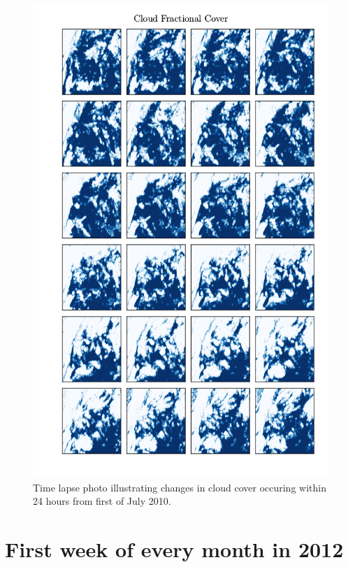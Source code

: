 \begin{figure}[ht]
    \centering
    \includegraphics[scale=0.70]{python_figs/timelapse_cloud_cover_24hrs_from_2010-07-01.png}
    \caption{Time lapse photo illustrating changes in cloud cover occuring within 24 hours from first of July 2010.}
    \label{fig:time_lapse}
\end{figure}


\chapter{First week of every month in 2012} \label{app:first_week}

